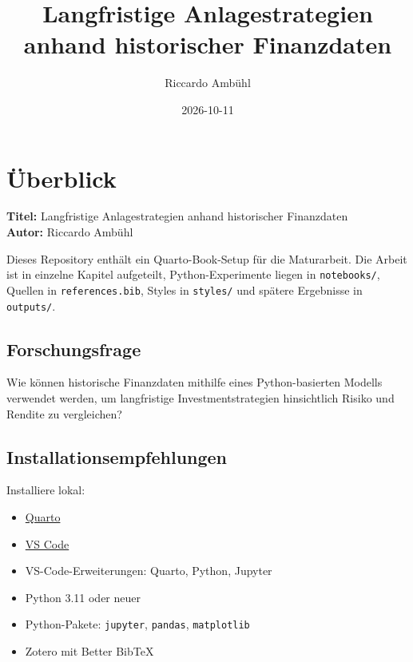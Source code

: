\documentclass[
  ngerman,
  a4paper,
  DIV=11,
  oneside]{scrreprt}
\title{Langfristige Anlagestrategien anhand historischer Finanzdaten}
\author{Riccardo Ambühl}
\date{2026-10-11}
\providecommand{\tightlist}{%
  \setlength{\itemsep}{0pt}\setlength{\parskip}{0pt}}
\renewcommand*\contentsname{Inhaltsverzeichnis}
\newcommand\contentsname{Inhaltsverzeichnis}
\begin{document}
\maketitle

\renewcommand*\contentsname{Inhaltsverzeichnis}
{
\setcounter{tocdepth}{2}
\tableofcontents
}


\chapter{Überblick}\label{uxfcberblick}

\textbf{Titel:} Langfristige Anlagestrategien anhand historischer
Finanzdaten\\
\textbf{Autor:} Riccardo Ambühl

Dieses Repository enthält ein Quarto-Book-Setup für die Maturarbeit. Die
Arbeit ist in einzelne Kapitel aufgeteilt, Python-Experimente liegen in
\texttt{notebooks/}, Quellen in \texttt{references.bib}, Styles in
\texttt{styles/} und spätere Ergebnisse in \texttt{outputs/}.

\section{Forschungsfrage}\label{forschungsfrage}

Wie können historische Finanzdaten mithilfe eines Python-basierten
Modells verwendet werden, um langfristige Investmentstrategien
hinsichtlich Risiko und Rendite zu vergleichen?

\section{Installationsempfehlungen}\label{installationsempfehlungen}

Installiere lokal:

\begin{itemize}
\tightlist
\item
  \href{https://quarto.org/}{Quarto}
\item
  \href{https://code.visualstudio.com/}{VS Code}
\item
  VS-Code-Erweiterungen: Quarto, Python, Jupyter
\item
  Python 3.11 oder neuer
\item
  Python-Pakete: \texttt{jupyter}, \texttt{pandas}, \texttt{matplotlib}
\item
  Zotero mit Better BibTeX
\end{itemize}
\end{document}
